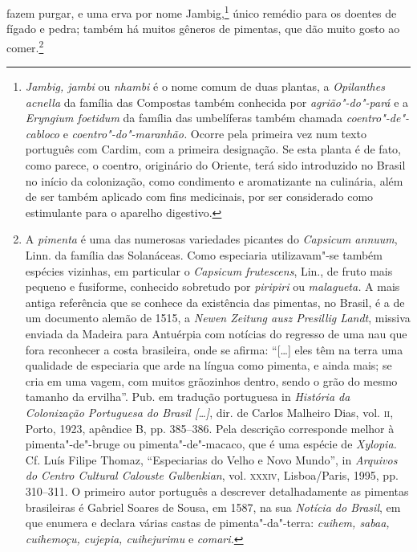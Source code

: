 \begin{linenumbers}
fazem purgar, e uma erva por nome Jambig,\footnote{ \textit{Jambig,
jambi} ou \textit{nhambi} é o nome comum de duas plantas, a
\textit{Opilanthes acnella} da família das Compostas também conhecida
por \textit{agrião"-do"-pará} e a \textit{Eryngium foetidum} da família
das umbelíferas também chamada \textit{coentro"-de"-cabloco} e 
\textit{coentro"-do"-maranhão.} Ocorre pela primeira vez num texto
português com Cardim, com a primeira designação. Se esta planta é de
fato, como parece, o coentro, originário do Oriente, terá sido
introduzido no Brasil no início da colonização, como condimento e
aromatizante na culinária, além de ser também aplicado com fins
medicinais, por ser considerado como estimulante para o aparelho
digestivo.} único remédio para os doentes de fígado e pedra;
também há muitos gêneros de pimentas, que dão muito gosto ao 
comer.\footnote{ A \textit{pimenta} é uma das numerosas variedades picantes
do \textit{Capsicum annuum}, Linn. da família das Solanáceas. Como
especiaria utilizavam"-se também espécies vizinhas, em particular o
\textit{Capsicum frutescens}, Lin., de fruto mais pequeno e fusiforme,
conhecido sobretudo por \textit{piripiri} ou \textit{malagueta.} A mais
antiga referência que se conhece da existência das pimentas, no
Brasil, é a de um documento alemão de 1515, a \textit{Newen Zeitung
ausz Presillig Landt}, missiva enviada da Madeira para Antuérpia com
notícias do regresso de uma nau que fora reconhecer a costa brasileira,
onde se afirma: ``[\ldots{}] eles têm na terra uma qualidade de especiaria
que arde na língua como pimenta, e ainda mais; se cria em uma vagem,
com muitos grãozinhos dentro, sendo o grão do mesmo tamanho da
ervilha''. Pub. em tradução portuguesa in \textit{História da
Colonização Portuguesa do Brasil [\ldots{}]}, dir. de Carlos Malheiro Dias,
vol. \textsc{ii}, Porto, 1923, apêndice B, pp. 385--386. Pela descrição
corresponde melhor à pimenta"-de"-bruge ou pimenta"-de"-macaco, que é uma
espécie de \textit{Xylopia.} Cf. Luís Filipe Thomaz, ``Especiarias do
Velho e Novo Mundo'', in \textit{Arquivos do Centro Cultural Calouste
Gulbenkian}, vol. \textsc{xxxiv}, Lisboa/Paris, 1995, pp. 310--311. O primeiro
autor português a descrever detalhadamente as pimentas brasileiras é
Gabriel Soares de Sousa, em 1587, na sua \textit{Notícia do Brasil}, 
em que enumera e declara várias castas de pimenta"-da"-terra:
\textit{cuihem, sabaa, cuihemoçu, cujepia, cuihejurimu} e \textit{comari.}} 


\end{linenumbers}
